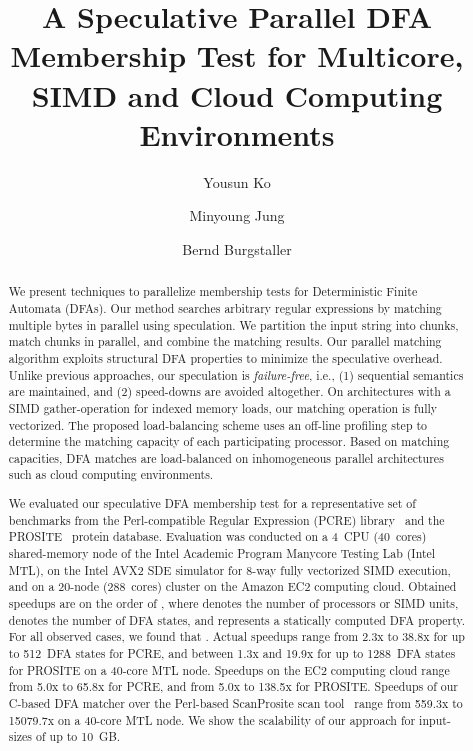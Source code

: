 \documentclass[smallextended]{svjour3}
\begin{document}
\title{A Speculative Parallel DFA Membership Test for Multicore, SIMD and Cloud
Computing Environments}

\author{Yousun Ko
        \and Minyoung Jung
        \and {}
        \and Bernd Burgstaller}

\date{}

\maketitle

\begin{abstract}
We present techniques to parallelize membership tests for
Deterministic Finite Automata (DFAs). Our method searches
arbitrary regular expressions by matching multiple
bytes in parallel using speculation. We partition the input
string into chunks, match chunks in parallel, and combine the 
matching results. Our parallel
matching algorithm exploits structural DFA properties to minimize
the speculative overhead. Unlike previous approaches, our
speculation is {\em failure-free\/}, i.e., (1) sequential
semantics are maintained, and (2) speed-downs are avoided
altogether.
On architectures with a SIMD gather-operation for indexed memory loads,
our matching operation is fully vectorized.
The proposed load-balancing scheme uses
an off-line profiling step to determine the matching capacity of each
participating processor. Based on matching capacities, DFA matches
are load-balanced on inhomogeneous parallel architectures such as
cloud computing environments.

We evaluated our speculative DFA membership test for a representative 
set of benchmarks from the Perl-compatible
Regular Expression (PCRE) library~\cite{PCRELib} and
the PROSITE~\cite{PROSITE} protein database. Evaluation was conducted
on a 4~CPU (40~cores) shared-memory node of the Intel
Academic Program Manycore Testing Lab (Intel MTL), 
on the Intel AVX2 SDE simulator for 8-way 
fully vectorized SIMD execution, and on a 20-node (288~cores)
cluster on the Amazon EC2 computing cloud.
Obtained speedups are on the order of
,
where  denotes the number of processors or SIMD units, 
 denotes the number of DFA states, and  
represents a statically computed DFA property. For all 
observed cases, we found that . Actual speedups range 
from 2.3x to 38.8x for up to 512~DFA states for PCRE, and between 1.3x and 19.9x 
for up to 1288~DFA states for PROSITE on a 40-core MTL node. 
Speedups
on the EC2 computing cloud range from 5.0x to 65.8x for PCRE, and from 5.0x to 138.5x
for PROSITE. Speedups of our C-based DFA matcher over the Perl-based
ScanProsite scan tool~\cite{ScanProsite} range from 559.3x to 15079.7x on a 40-core 
MTL node. We show the scalability of our approach for input-sizes of up to \SI{10}{GB}.

\end{abstract}
\end{document}
